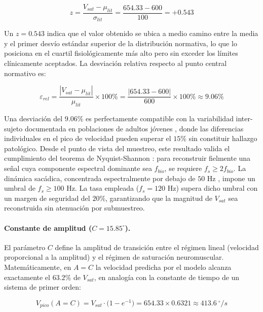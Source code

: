 \begin{equation}
	z = \frac{V_{sat} - \mu_{lit}}{\sigma_{lit}} = \frac{654.33 - 600}{100} = +0.543
	\label{eq:zscore_vsat}
\end{equation}

Un $z = 0.543$ indica que el valor obtenido se ubica a medio camino entre la media y el primer desvío estándar superior de la distribución normativa, lo que lo posiciona en el cuartil fisiológicamente más alto pero sin exceder los límites clínicamente aceptados.
La desviación relativa respecto al punto central normativo es:

\begin{equation}
	\varepsilon_{rel} = \frac{|V_{sat} - \mu_{lit}|}{\mu_{lit}} \times 100\% = \frac{|654.33 - 600|}{600} \times 100\% \approx 9.06\%
	\label{eq:err_rel_vsat}
\end{equation}

Una desviación del $9.06\%$ es perfectamente compatible con la variabilidad inter-sujeto documentada en poblaciones de adultos jóvenes \cite{boghen1974velocity, collewijn1988binocular}, donde las diferencias individuales en el pico de velocidad pueden superar el $15\%$ sin constituir hallazgo patológico.
Desde el punto de vista del muestreo, este resultado valida el cumplimiento del teorema de Nyquist-Shannon \cite{nyquist1928certain}: para reconstruir fielmente una señal cuya componente espectral dominante sea $f_{bio}$, se requiere $f_s \geq 2 f_{bio}$.
La dinámica sacádica, concentrada espectralmente por debajo de $50$ Hz \cite{harwood1999spectral}, impone un umbral de $f_s \geq 100$ Hz.
La tasa empleada ($f_s = 120$ Hz) supera dicho umbral con un margen de seguridad del $20\%$, garantizando que la magnitud de $V_{sat}$ sea reconstruida sin atenuación por submuestreo.
\paragraph{Constante de amplitud ($C = 15.85^\circ$).}

El parámetro $C$ define la amplitud de transición entre el régimen lineal (velocidad proporcional a la amplitud) y el régimen de saturación neuromuscular.
Matemáticamente, en $A = C$ la velocidad predicha por el modelo alcanza exactamente el $63.2\%$ de $V_{sat}$, en analogía con la constante de tiempo de un sistema de primer orden:

\begin{equation}
	V_{pico}(A = C) = V_{sat} \cdot \bigl(1 - e^{-1}\bigr) = 654.33 \times 0.6321 \approx 413.6~^\circ/s
	\label{eq:C_interpretation}
\end{equation}

